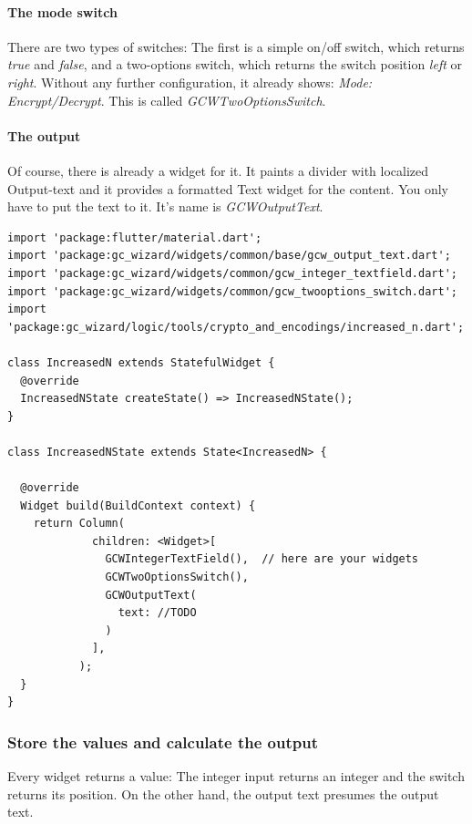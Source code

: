 \paragraph{The mode switch} There are two types of switches: The first is a simple on/off switch, which returns \emph{true} and \emph{false}, and a two-options switch, which returns the switch position \emph{left} or \emph{right}. Without any further configuration, it already shows: \emph{Mode: Encrypt/Decrypt}. This is called \emph{GCWTwoOptionsSwitch}.

\paragraph{The output} Of course, there is already a widget for it. It paints a divider with localized Output-text and it provides a formatted Text widget for the content. You only have to put the text to it. It's name is \emph{GCWOutputText}. 

\begin{lstlisting}
import 'package:flutter/material.dart';
import 'package:gc_wizard/widgets/common/base/gcw_output_text.dart';
import 'package:gc_wizard/widgets/common/gcw_integer_textfield.dart';
import 'package:gc_wizard/widgets/common/gcw_twooptions_switch.dart';
import 'package:gc_wizard/logic/tools/crypto_and_encodings/increased_n.dart';

class IncreasedN extends StatefulWidget {
  @override
  IncreasedNState createState() => IncreasedNState();
}

class IncreasedNState extends State<IncreasedN> {
    
  @override
  Widget build(BuildContext context) {
    return Column(
             children: <Widget>[
               GCWIntegerTextField(),  // here are your widgets
               GCWTwoOptionsSwitch(),
               GCWOutputText(
                 text: //TODO
               )
             ],
           );
  }
}
\end{lstlisting}
\label{fig: widgetlayout}

\subsubsection{Store the values and calculate the output}
Every widget returns a value: The integer input returns an integer and the switch returns its position. On the other hand, the output text presumes the output text.\par 

